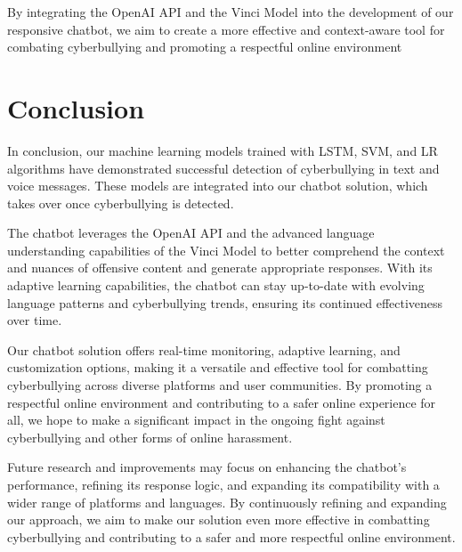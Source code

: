 \documentclass[conference]{IEEEtran}
\begin{document}
By integrating the OpenAI API and the Vinci Model into the development of our responsive chatbot, we aim to create a more effective and context-aware tool for combating cyberbullying and promoting a respectful online environment


\section{Conclusion}

In conclusion, our machine learning models trained with LSTM, SVM, and LR algorithms have demonstrated successful detection of cyberbullying in text and voice messages. These models are integrated into our chatbot solution, which takes over once cyberbullying is detected.

The chatbot leverages the OpenAI API and the advanced language understanding capabilities of the Vinci Model to better comprehend the context and nuances of offensive content and generate appropriate responses. With its adaptive learning capabilities, the chatbot can stay up-to-date with evolving language patterns and cyberbullying trends, ensuring its continued effectiveness over time.

Our chatbot solution offers real-time monitoring, adaptive learning, and customization options, making it a versatile and effective tool for combatting cyberbullying across diverse platforms and user communities. By promoting a respectful online environment and contributing to a safer online experience for all, we hope to make a significant impact in the ongoing fight against cyberbullying and other forms of online harassment.

Future research and improvements may focus on enhancing the chatbot's performance, refining its response logic, and expanding its compatibility with a wider range of platforms and languages. By continuously refining and expanding our approach, we aim to make our solution even more effective in combatting cyberbullying and contributing to a safer and more respectful online environment.
\end{document}

